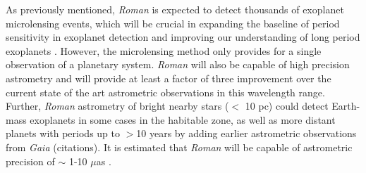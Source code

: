 \documentclass[twocolumn]{aastex631}
\newcommand{\racomment}[1]{{\color{blue}#1}}
\begin{document}
As previously mentioned, \textit{Roman} is expected to detect thousands of exoplanet microlensing events, which will be crucial in expanding the baseline of period sensitivity in exoplanet detection and improving our understanding of long period exoplanets \citep{Penny2019, Johnson2020}. However, the microlensing method only provides for a single observation of a planetary system. \textit{Roman} will also be capable of high precision astrometry and will provide at least a factor of three improvement over the current state of the art astrometric observations in this wavelength range. Further, \textit{Roman} astrometry of bright nearby stars ($<$ 10 pc) could detect Earth-mass exoplanets in some cases in the habitable zone, as well as more distant planets with periods up to $>$10 years by adding earlier astrometric observations from \textit{Gaia} \racomment{(citations)}.
It is estimated that \textit{Roman} will be capable of astrometric precision of $\sim$ 1-10 $\mu$as \citep{Sanderson2019}. 
\end{document}
